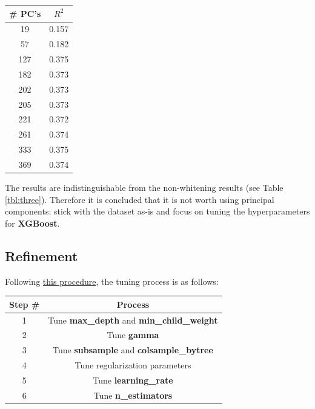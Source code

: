\documentclass[12pt]{article}
\theoremstyle{plain} %
\theoremstyle{definition} %
\theoremstyle{remark} %
\begin{document}
\begin{center}
\begin{tabular}{c | c }
\hline
\# PC's & $R^2$ \\ \hline
 19 & 0.157 \\ \hline
57 & 0.182 \\ \hline
127 & 0.375 \\ \hline
182 & 0.373 \\ \hline
202 & 0.373 \\ \hline
205 & 0.373 \\ \hline
221 & 0.372 \\ \hline
261 & 0.374 \\ \hline
333 & 0.375 \\ \hline
369 & 0.374 \\ \hline
\end{tabular}
\label{tbl:three}
\end{center}

\par The results are indistinguishable from the non-whitening results (see Table \ref{tbl:three}).  Therefore it is concluded that it is not worth using principal components; stick with the dataset as-is and focus on tuning the hyperparameters for \textbf{XGBoost}.

\subsection*{Refinement}
\indent \par Following \href{https://www.analyticsvidhya.com/blog/2016/03/complete-guide-parameter-tuning-xgboost-with-codes-python/}{this procedure}, the tuning process is as follows:

\begin{center}
\begin{tabular}{c | c }
\hline
Step \# & Process \\ \hline
 1 & Tune \textbf{max\_depth} and \textbf{min\_child\_weight} \\ \hline
 2 & Tune \textbf{gamma} \\ \hline
 3 & Tune \textbf{subsample} and \textbf{colsample\_bytree} \\ \hline
 4 & Tune regularization parameters \\ \hline
 5 & Tune \textbf{learning\_rate} \\ \hline
 6 & Tune \textbf{n\_estimators} \\ \hline
\end{tabular}
\end{center}
\end{document}
